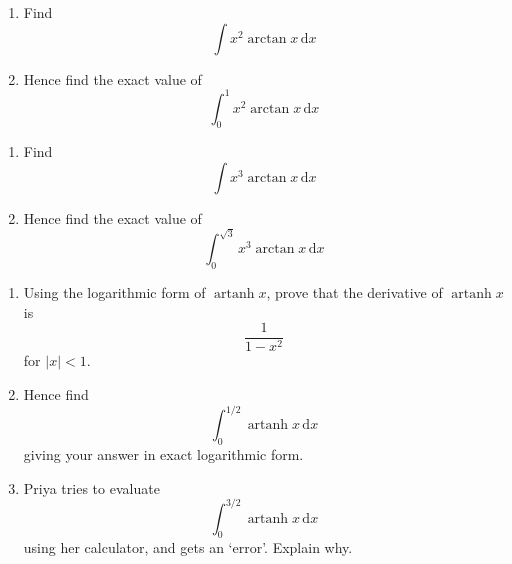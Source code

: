 \documentclass[leqno]{article}
\begin{document}
\begin{enumerate}[
  label=\textbf{\arabic*.},
  leftmargin=*,
  topsep=0pt,
  partopsep=0pt,
  parsep=0pt
]
\newpage

\questionitem

\begin{enumerate}[label=\textbf{(\alph*)}]
  \item Find
  \[
  \int x^2\arctan x\,\mathrm{d}x
  \]
  \item Hence find the exact value of
  \[
  \int_0^1 x^2\arctan x\,\mathrm{d}x
  \]
\end{enumerate}

\newpage

\questionitem

\begin{enumerate}[label=\textbf{(\alph*)}]
  \item Find
  \[
  \int x^3\arctan x\,\mathrm{d}x
  \]
  \item Hence find the exact value of
  \[
  \int_0^{\sqrt{3}} x^3\arctan x\,\mathrm{d}x
  \]
\end{enumerate}

\newpage

\questionitem

\begin{enumerate}[label=\textbf{(\alph*)}]
  \item Using the logarithmic form of $\operatorname{artanh} x$, prove that the derivative of $\operatorname{artanh} x$ is
  \[
  \frac{1}{1-x^2}
  \]
  for $|x|<1$.  \\
  \item Hence find
  \[
  \int_0^{1/2} \operatorname{artanh} x\,\mathrm{d}x
  \]
  giving your answer in exact logarithmic form.  \\
  \item Priya tries to evaluate
  \[
  \int_0^{3/2} \operatorname{artanh} x\,\mathrm{d}x
  \]
  using her calculator, and gets an `error'. Explain why.  \\
\end{enumerate}

\newpage

\questionitem


\end{enumerate}
\end{document}
